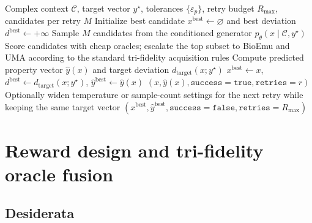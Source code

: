 \documentclass[11pt]{article}
\begin{document}
	\begin{algorithm}[H]
		\caption{Target-conditioned complex-aware generation with bounded retries}
		\label{alg:targeted_v11}
		\begin{algorithmic}[1]
			\Require Complex context $\mathcal{C}$, target vector $y^\star$, tolerances $\{\varepsilon_p\}$, retry budget $R_{\max}$, candidates per retry $M$
			\State Initialize best candidate $x^{\mathrm{best}}\leftarrow \varnothing$ and best deviation $d^{\mathrm{best}}\leftarrow +\infty$
			\State Sample $M$ candidates from the conditioned generator $p_\theta(x\mid \mathcal{C},y^\star)$
			\State Score candidates with cheap oracles; escalate the top subset to BioEmu and UMA according to the standard tri-fidelity acquisition rules
			\State Compute predicted property vector $\hat y(x)$ and target deviation $d_{\mathrm{target}}(x;y^\star)$
			\State $x^{\mathrm{best}}\leftarrow x$, $d^{\mathrm{best}}\leftarrow d_{\mathrm{target}}(x;y^\star)$, $\hat y^{\mathrm{best}}\leftarrow \hat y(x)$
			\EndIf
			\State \Return $(x,\hat y(x),\texttt{success}=\texttt{true},\texttt{retries}=r)$
			\EndIf
			\EndFor
			\State Optionally widen temperature or sample-count settings for the next retry while keeping the same target vector
			\EndFor
			\State \Return $(x^{\mathrm{best}},\hat y^{\mathrm{best}},\texttt{success}=\texttt{false},\texttt{retries}=R_{\max})$
		\end{algorithmic}
	\end{algorithm}
	
	
	\section{Reward design and tri-fidelity oracle fusion}
	\label{sec:reward}
	
	\subsection{Desiderata}
	
\end{document}
